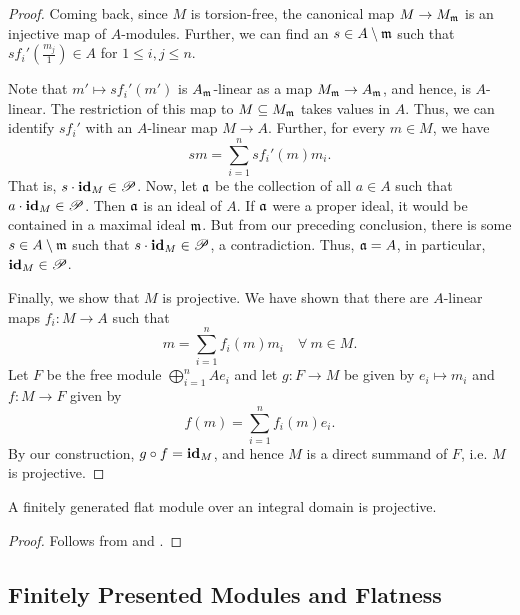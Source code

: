 \begin{proof}
    Coming back, since $M$ is torsion-free, the canonical map $M\to M_{\mathfrak{m}}$ is an injective map of $A$-modules. Further, we can find an $s\in A\setminus\mathfrak{m}$ such that $s f_i'\left(\frac{m_j}{1}\right)\in A$ for $1\le i,j\le n$. 

    Note that $m'\mapsto sf_i'(m')$ is $A_{\mathfrak{m}}$-linear as a map $M_{\mathfrak{m}}\to A_{\mathfrak{m}}$, and hence, is $A$-linear. The restriction of this map to $M\subseteq M_{\mathfrak{m}}$ takes values in $A$. Thus, we can identify $sf_i'$ with an $A$-linear map $M\to A$. Further, for every $m\in M$, we have 
    \begin{equation*}
        sm = \sum_{i = 1}^n sf_i'(m)m_i.
    \end{equation*}
    That is, $s\cdot\mathbf{id}_M\in\mathscr P$. Now, let $\mathfrak{a}$ be the collection of all $a\in A$ such that $a\cdot\mathbf{id}_M\in\mathscr P$. Then $\mathfrak{a}$ is an ideal of $A$. If $\mathfrak{a}$ were a proper ideal, it would be contained in a maximal ideal $\mathfrak{m}$. But from our preceding conclusion, there is some $s\in A\setminus\mathfrak{m}$ such that $s\cdot\mathbf{id}_M\in\mathscr P$, a contradiction. Thus, $\mathfrak{a} = A$, in particular, $\mathbf{id}_M\in\mathscr P$.

    Finally, we show that $M$ is projective. We have shown that there are $A$-linear maps $f_i: M\to A$ such that 
    \begin{equation*}
        m = \sum_{i = 1}^n f_i(m)m_i\quad\forall~m\in M.
    \end{equation*}
    Let $F$ be the free module $\bigoplus_{i = 1}^n Ae_i$ and let $g: F\to M$ be given by $e_i\mapsto m_i$ and $f: M\to F$ given by 
    \begin{equation*}
        f(m) = \sum_{i = 1}^n f_i(m)e_i.
    \end{equation*}
    By our construction, $g\circ f = \mathbf{id}_M$, and hence $M$ is a direct summand of $F$, i.e. $M$ is projective.
\end{proof}

\begin{corollary}
    A finitely generated flat module over an integral domain is projective.
\end{corollary}
\begin{proof}
    Follows from  and .
\end{proof}

\subsection{Finitely Presented Modules and Flatness}

